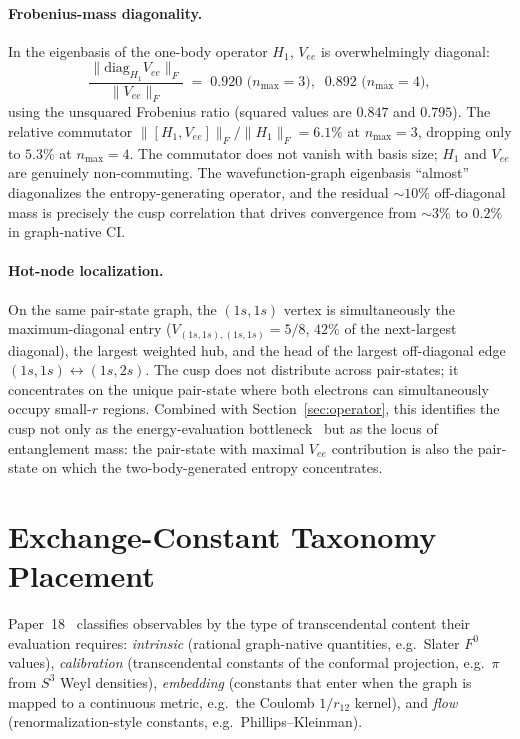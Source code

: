 \documentclass[twocolumn,pra,amsmath,amssymb,superscriptaddress]{revtex4-2}
\begin{document}
\paragraph*{Frobenius-mass diagonality.}  In the eigenbasis of
the one-body operator $H_1$, $V_{ee}$ is overwhelmingly
diagonal:
\begin{equation}
  \frac{\lVert \mathrm{diag}_{H_1}\!V_{ee}\rVert_F}
       {\lVert V_{ee}\rVert_F}
  \;=\; 0.920 \text{ (}n_{\max}=3\text{)},
  \;\; 0.892 \text{ (}n_{\max}=4\text{)},
\end{equation}
using the unsquared Frobenius ratio (squared values are $0.847$
and $0.795$).  The relative commutator
$\lVert [H_1, V_{ee}]\rVert_F / \lVert H_1 \rVert_F = 6.1\%$ at
$n_{\max}=3$, dropping only to $5.3\%$ at $n_{\max}=4$.  The
commutator does not vanish with basis size; $H_1$ and $V_{ee}$
are genuinely non-commuting.  The wavefunction-graph eigenbasis
``almost'' diagonalizes the entropy-generating operator, and the
residual $\sim 10\%$ off-diagonal mass is precisely the cusp
correlation that drives convergence from $\sim 3\%$ to $0.2\%$
in graph-native CI.

\paragraph*{Hot-node localization.}  On the same pair-state
graph, the $(1s,1s)$ vertex is simultaneously the
maximum-diagonal entry ($V_{(1s,1s),(1s,1s)} = 5/8$, $42\%$
of the next-largest diagonal), the largest weighted hub, and
the head of the largest off-diagonal edge
$(1s,1s)\leftrightarrow(1s,2s)$.  The cusp does not distribute
across pair-states; it concentrates on the unique pair-state
where both electrons can simultaneously occupy small-$r$
regions.  Combined with Section~\ref{sec:operator}, this
identifies the cusp not only as the energy-evaluation
bottleneck~\cite{GeoVac_Paper18} but as the locus of
entanglement mass: the pair-state with maximal $V_{ee}$
contribution is also the pair-state on which the
two-body-generated entropy concentrates.

\section{Exchange-Constant Taxonomy Placement}
\label{sec:taxonomy}

Paper~18~\cite{GeoVac_Paper18} classifies observables by the
type of transcendental content their evaluation requires:
\emph{intrinsic} (rational graph-native quantities, e.g.\ Slater
$F^{0}$ values), \emph{calibration} (transcendental constants of
the conformal projection, e.g.\ $\pi$ from $S^{3}$ Weyl
densities), \emph{embedding} (constants that enter when the
graph is mapped to a continuous metric, e.g.\ the Coulomb
$1/r_{12}$ kernel), and \emph{flow} (renormalization-style
constants, e.g.\ Phillips--Kleinman).
\end{document}
